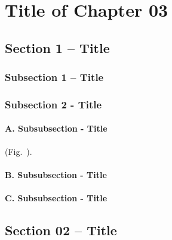 \chapter{Title of Chapter 03}
\label{chap:Design&Fabrication} 


\section{Section 1 -- Title}\label{sec:C3_HSRs}

\subsection{Subsection 1 -- Title}\label{subsec:C3_HSR_Motivation}

\lipsum[1]


\subsection{Subsection 2 - Title}\label{subsec:C3_HSRdesign}


\subsubsection{A. Subsubsection - Title} \label{subsubsec:C3_backbone}

\lipsum[1] 
(Fig.~).

\subsubsection{B. Subsubsection - Title} \label{subsubsec:C3_PMAs}

\lipsum[1] 


\subsubsection{C. Subsubsection - Title} \label{subsubsec:C3_HSR_Assembly}

\lipsum[1] 

\section{Section 02 -- Title} \label{sec:C3_SRS} 

\lipsum[1] 

